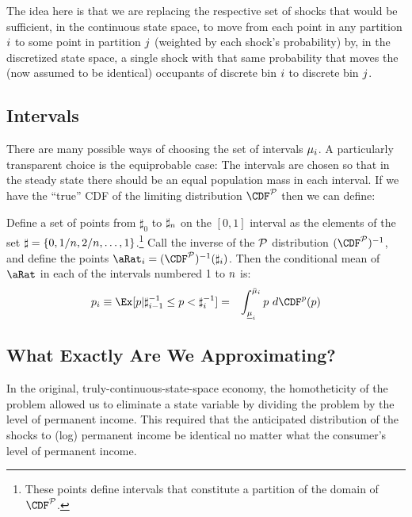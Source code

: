 \documentclass[\econtexRoot/BufferStockTheory.tex]{subfiles}
\begin{document}
The idea here is that we are replacing the respective set of shocks that would be sufficient, in the continuous state space, to move from each point in any partition $i$ to some point in partition $j$ (weighted by each shock's probability) by, in the discretized state space, a single shock with that same probability that moves the (now assumed to be identical) occupants of discrete bin ${i}$ to discrete bin ${j}$.

\subsection{Intervals}

There are many possible ways of choosing the set of intervals $\mu_{i}$.  A particularly transparent choice is the equiprobable case: The intervals are chosen so that in the steady state there should be an equal population mass in each interval.  If we have the ``true'' CDF of the limiting distribution $\CDF^{\PrbFullCnts}$ then we can define:

Define a set of points from $\sharp_{0}$ to $\sharp_{n}$ on the $[0,1]$ interval as the elements of the set $\sharp = \{0,1/n,2/n, \ldots,1\}$.\footnote{These points define intervals that constitute a partition of the domain of $\CDF^{\PrbFullCnts}$.}  Call the inverse of the $\mathcal{P}$ distribution $(\CDF^{\PrbFullCnts})^{-1}$, and define the points $\pnt_{\thisBin} = (\CDF^{\PrbFullCnts})^{-1}(\sharp_{\thisBin})$.  Then the conditional mean of $\pnt$ in each of the intervals numbered 1 to $n$ is:
\begin{eqnarray}
  \pLog_{\thisBin} \equiv \Ex[\pLog | \sharp_{\thisBin-1}^{-1} \leq \pLog < \sharp_{\thisBin}^{-1}] & = & \int_{\Bot{\SetPartCnts}_{\thisBin}}^{\Top{\SetPartCnts}_{\thisBin}} \pLog ~ d\CDF^{\pLog}(\pLog)
\end{eqnarray}


\subsection{What Exactly Are We Approximating?}

In the original, truly-continuous-state-space economy, the homotheticity of the problem allowed us to eliminate a state variable by dividing the problem by the level of permanent income.  This required that the anticipated distribution of the shocks to (log) permanent income be identical no matter what the consumer's level of permanent income.
\end{document}
